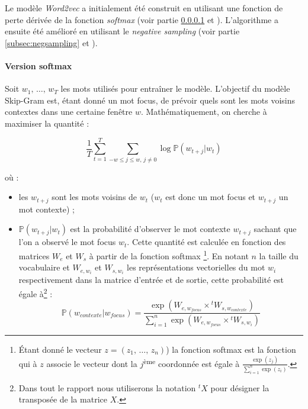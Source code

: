 \documentclass[11pt,french,french]{article}
\let\rmarkdownfootnote\footnote%
\def\footnote{\protect\rmarkdownfootnote}
\begin{document}
Le modèle \emph{Word2vec} a initialement été construit en utilisant une
fonction de perte dérivée de la fonction \emph{softmax} (voir partie
\ref{subsec:softmax} et \cite{Mikolov}). L'algorithme a ensuite été
amélioré en utilisant le \emph{negative sampling} (voir partie
\ref{subsec:negsampling} et \cite{MikolovNS}).

\paragraph{Version softmax}\label{subsec:softmax}

Soit \(w_1,\,\dots,\,w_T\) les mots utilisés pour entraîner le modèle.
L'objectif du modèle Skip-Gram est, étant donné un mot focus, de prévoir
quels sont les mots voisins contextes dans une certaine fenêtre \(w\).
Mathématiquement, on cherche à maximiser la quantité :

\begin{equation}
\frac 1 T\sum_{t=1}^T\sum_{-w\leq j \leq w,\,j\ne 0} \log \mathbb P(w_{t+j}\vert w_{t})
\label{eq:objSoftMax}
\end{equation}

où :

\begin{itemize}
\item
  les \(w_{t+j}\) sont les mots voisins de \(w_t\) (\(w_t\) est donc un
  mot focus et \(w_{t+j}\) un mot contexte) ;
\item
  \(\mathbb P(w_{t+j}\vert w_{t})\) est la probabilité d'observer le mot
  contexte \(w_{t+j}\) sachant que l'on a observé le mot focus \(w_t\).
  Cette quantité est calculée en fonction des matrices \(W_e\) et
  \(W_s\) à partir de la fonction softmax \footnote{Étant donné le
    vecteur \(z=(z_1,\,\dots,\,z_n)\)) la fonction softmax est la
    fonction qui à \(z\) associe le vecteur dont la
    \(j\)\textsuperscript{ème} coordonnée est égale à
    \(\frac{\exp(z_j)}{\sum_{i=1}^n\exp(z_i)}\).}. En notant \(n\) la
  taille du vocabulaire et \(W_{e,w_i}\) et \(W_{s,w_i}\) les
  représentations vectorielles du mot \(w_i\) respectivement dans la
  matrice d'entrée et de sortie, cette probabilité est égale à\footnote{Dans
    tout le rapport nous utiliserons la notation \(^{t}X\) pour désigner
    la transposée de la matrice \(X\).} : \[
  \mathbb P(w_{contexte}\vert w_{focus}) = 
  \frac{
  \exp(W_{e,w_{focus}}\times {}^tW_{s,w_{contexte}})
  }{
  \sum_{i=1}^n\exp(W_{e,w_{focus}}\times {}^tW_{s,w_{i}})
  }
  \]
\end{itemize}
\end{document}
